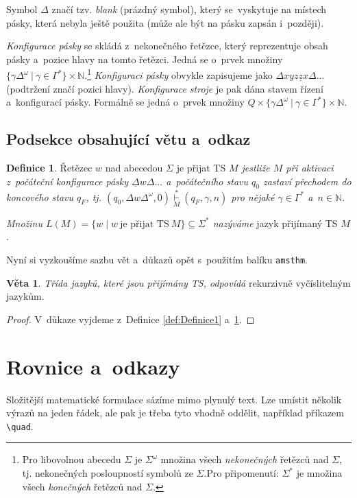 \documentclass[twocolumn,a4paper,11pt]{article}
\theoremstyle{definition}
\newtheorem{definition}{Definice}
\newtheorem{sentence}{Věta}
\begin{document}
Symbol $\Delta$ značí tzv. \emph{blank} (prázdný symbol), který
se~vyskytuje na místech pásky, která nebyla ještě použita
(může ale být na pásku zapsán i~později).

\emph{Konfigurace pásky} se skládá z~nekonečného řetězce,
který reprezentuje obsah pásky a~pozice hlavy na tomto řetězci. 
Jedná se o~prvek množiny $\{\gamma \Delta^\omega\ |\ \gamma \in \Gamma^\ast\}\times \mathbb{N}$.\footnote{Pro libovolnou abecedu $\Sigma$ je $\Sigma^\omega$ množina všech \emph{nekonečných}
řetězců nad $\Sigma$, tj. nekonečných posloupností symbolů ze $\Sigma$.Pro připomenutí: $\Sigma^\ast$ je množina všech \emph{konečných} řetězců nad $\Sigma$.}
\emph{Konfiguraci pásky} obvykle zapisujeme jako $\Delta xyz\underline{z}x\Delta...$ (podtržení značí pozici hlavy). \emph{Konfigurace stroje} je pak
dána stavem řízení a~konfigurací pásky. Formálně se jedná
o~prvek množiny $Q \times \{\gamma \Delta^\omega\ |\ \gamma \in \Gamma^\ast\}\times \mathbb{N}.$

\subsection{Podsekce obsahující větu a~odkaz}
\begin{definition}
\label{def:Definice2}
Řetězec $w$ nad abecedou $\Sigma$ je přijat TS \emph{$M$
jestliže $M$ při aktivaci z~počáteční konfigurace pásky $\underline{\Delta}w\Delta...$ a~počátečního stavu $q_0$ zastaví přechodem do koncového stavu $q_F$, tj. $(q_0, \Delta w\Delta^\omega, 0)\underset{M}{\overset{\ast}{\vdash}}(q_F, \gamma, n)$ pro nějaké $\gamma \in \Gamma^\ast$ a~$n \in \mathbb{N}$.}

\emph{Množinu $L(M) = \lbrace w\mid w\ \text{je přijat TS}\ M\rbrace\subseteq\Sigma^\ast$ nazýváme} jazyk přijímaný TS $M$.
\end{definition}

Nyní si vyzkoušíme sazbu vět a~důkazů opět s~použitím balíku \texttt{amsthm}.

\begin{sentence}
\emph{Třída jazyků, které jsou přijímány TS, odpovídá}
rekurzivně vyčíslitelným jazykům.
\end{sentence}

\begin{proof}
V~důkaze vyjdeme z~Definice \ref{def:Definice1} a~\ref{def:Definice2}.
\end{proof}

\section{Rovnice a~odkazy}
Složitější matematické formulace sázíme mimo plynulý
text. Lze umístit několik výrazů na jeden řádek, ale pak je
třeba tyto vhodně oddělit, například příkazem \verb|\quad|.
\end{document}
